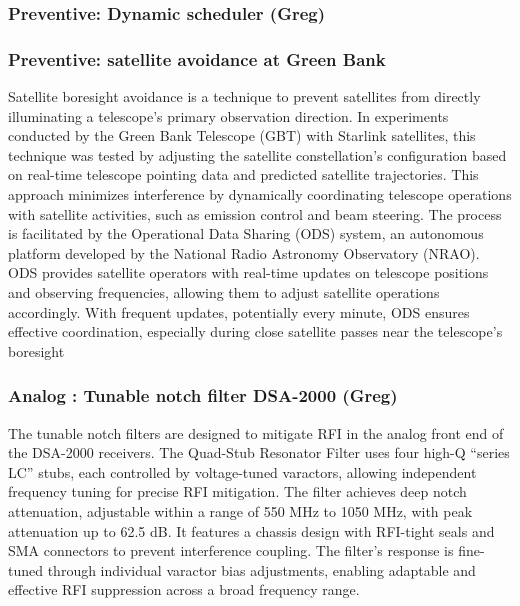 \subsubsection{Preventive: Dynamic scheduler (Greg)}
\subsubsection{Preventive: satellite avoidance at Green Bank}
Satellite boresight avoidance is a technique to prevent satellites from directly illuminating a telescope's primary observation direction. In experiments conducted by the Green Bank Telescope (GBT) with Starlink satellites, this technique was tested \cite{nhan2024spectrumcoexistencedemonstrationeffectiveness} by adjusting the satellite constellation's configuration based on real-time telescope pointing data and predicted satellite trajectories. This approach minimizes interference by dynamically coordinating telescope operations with satellite activities, such as emission control and beam steering. The process is facilitated by the Operational Data Sharing (ODS) system, an autonomous platform developed by the National Radio Astronomy Observatory (NRAO). ODS provides satellite operators with real-time updates on telescope positions and observing frequencies, allowing them to adjust satellite operations accordingly. With frequent updates, potentially every minute, ODS ensures effective coordination, especially during close satellite passes near the telescope’s boresight

\subsubsection{Analog : Tunable notch filter DSA-2000 (Greg)}

The tunable notch filters are designed to mitigate RFI in the analog front end of the DSA-2000 receivers. The Quad-Stub Resonator Filter uses four high-Q “series LC” stubs, each controlled by voltage-tuned varactors, allowing independent frequency tuning for precise RFI mitigation. The filter achieves deep notch attenuation, adjustable within a range of 550 MHz to 1050 MHz, with peak attenuation up to 62.5 dB. It features a chassis design with RFI-tight seals and SMA connectors to prevent interference coupling. The filter's response is fine-tuned through individual varactor bias adjustments, enabling adaptable and effective RFI suppression across a broad frequency range.

